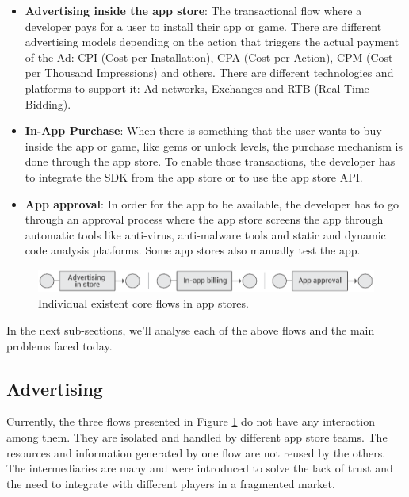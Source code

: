 \begin{itemize}
\item {\bf Advertising inside the app store}: The transactional flow where a developer pays for a user to install their app or game. There are different advertising models depending on the action that triggers the actual payment of the Ad: CPI (Cost per Installation), CPA (Cost per Action), CPM (Cost per Thousand Impressions) and others. There are different technologies and platforms to support it: Ad networks, Exchanges and RTB (Real Time Bidding).
\item {\bf In-App Purchase}: When there is something that the user wants to buy inside the app or game, like gems or unlock levels, the purchase mechanism is done through the app store. To enable those transactions, the developer has to integrate the SDK from the app store or to use the app store API.
\item {\bf App approval}: In order for the app to be available, the developer has to go through an approval process where the app store screens the app through automatic tools like anti-virus, anti-malware tools and static and dynamic code analysis platforms. Some app stores also manually test the app.
\end{itemize}


\begin{figure}[!ht]
\centering
\includegraphics[width=\textwidth]{diagrams/current_flows.eps}
\caption{Individual existent core flows in app stores.}
\label{fig:exist_flows}
\end{figure}




In the next sub-sections, we'll analyse each of the above flows and the main problems faced today.

\subsection{Advertising}
\label{subsec:intro_ads}


Currently, the three flows presented in Figure \ref{fig:exist_flows} do not have any interaction among them. They are isolated and handled by different app store teams. The resources and information generated by one flow are not reused by the others. The intermediaries are many and were introduced to solve the lack of trust and the need to integrate with different players in a fragmented market.  

